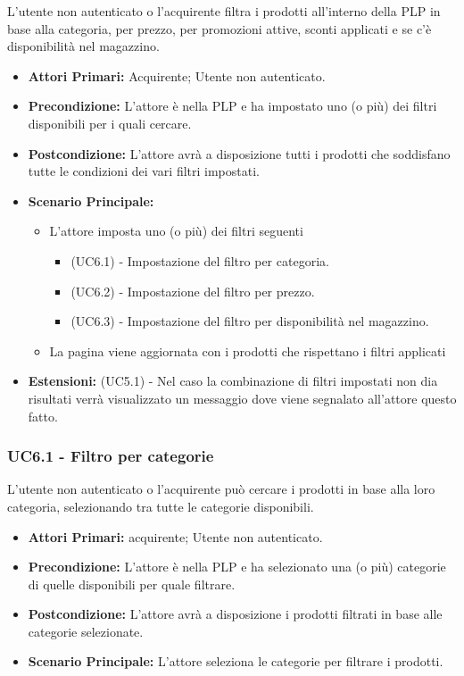 L'utente non autenticato o l'acquirente filtra i prodotti all'interno della PLP in base alla categoria, per prezzo, per promozioni attive, sconti applicati e se c'è disponibilità nel magazzino.
\begin{itemize}
    \item \textbf{Attori Primari:} Acquirente; Utente non autenticato.
    \item \textbf{Precondizione:} L'attore è nella PLP e ha impostato uno (o più) dei filtri disponibili per i quali cercare.
    \item \textbf{Postcondizione:} L'attore avrà a disposizione tutti i prodotti che soddisfano tutte le condizioni dei vari filtri impostati.
    \item \textbf{Scenario Principale:}
    \begin{itemize}
        \item L'attore imposta uno (o più) dei filtri seguenti 
        \begin{itemize}
            \item (UC6.1) - Impostazione del filtro per categoria.
            \item (UC6.2) - Impostazione del filtro per prezzo.
            \item (UC6.3) - Impostazione del filtro per disponibilità nel magazzino.
        \end{itemize}
        \item La pagina viene aggiornata con i prodotti che rispettano i filtri applicati
    \end{itemize}
    \item \textbf{Estensioni:} (UC5.1) - Nel caso la combinazione di filtri impostati non dia risultati verrà visualizzato un messaggio dove viene segnalato all'attore questo fatto.
\end{itemize}

\subsubsection{UC6.1 - Filtro per categorie} \label{UC6.1}
L'utente non autenticato o l'acquirente può cercare i prodotti in base alla loro categoria, selezionando tra tutte le categorie disponibili.
\begin{itemize}
    \item \textbf{Attori Primari:} acquirente; Utente non autenticato.
    \item \textbf{Precondizione:} L'attore è nella PLP e ha selezionato una (o più) categorie di quelle disponibili per quale filtrare.
    \item \textbf{Postcondizione:} L'attore avrà a disposizione i prodotti filtrati in base alle categorie selezionate.
    \item \textbf{Scenario Principale:} L'attore seleziona le categorie per filtrare i prodotti.
\end{itemize}

